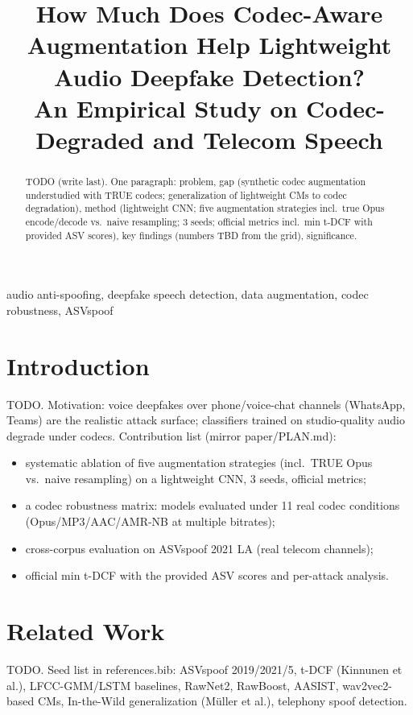 \documentclass[conference]{IEEEtran}
\title{How Much Does Codec-Aware Augmentation Help Lightweight Audio Deepfake Detection?\\
\large An Empirical Study on Codec-Degraded and Telecom Speech}
\author{\IEEEauthorblockN{Harshil, Madhigank, and Dr. Chetali}
\IEEEauthorblockA{Department of AI \& ML, <College Name>}}
\begin{document}
\maketitle

\begin{abstract}
TODO (write last). One paragraph: problem, gap (synthetic codec augmentation
understudied with TRUE codecs; generalization of lightweight CMs to codec
degradation), method (lightweight CNN; five augmentation strategies incl.\ true
Opus encode/decode vs.\ naive resampling; 3 seeds; official metrics incl.\
min t-DCF with provided ASV scores), key findings (numbers TBD from the grid),
significance.
\end{abstract}

\begin{IEEEkeywords}
audio anti-spoofing, deepfake speech detection, data augmentation, codec
robustness, ASVspoof
\end{IEEEkeywords}

\section{Introduction}
TODO. Motivation: voice deepfakes over phone/voice-chat channels (WhatsApp,
Teams) are the realistic attack surface; classifiers trained on studio-quality
audio degrade under codecs. Contribution list (mirror paper/PLAN.md):
\begin{itemize}
\item systematic ablation of five augmentation strategies (incl.\ TRUE Opus vs.\
naive resampling) on a lightweight CNN, 3 seeds, official metrics;
\item a codec robustness matrix: models evaluated under 11 real codec conditions
(Opus/MP3/AAC/AMR-NB at multiple bitrates);
\item cross-corpus evaluation on ASVspoof 2021 LA (real telecom channels);
\item official min t-DCF with the provided ASV scores and per-attack analysis.
\end{itemize}

\section{Related Work}
TODO. Seed list in references.bib: ASVspoof 2019/2021/5, t-DCF (Kinnunen et
al.), LFCC-GMM/LSTM baselines, RawNet2, RawBoost, AASIST, wav2vec2-based CMs,
In-the-Wild generalization (M\"uller et al.), telephony spoof detection.
\end{document}
